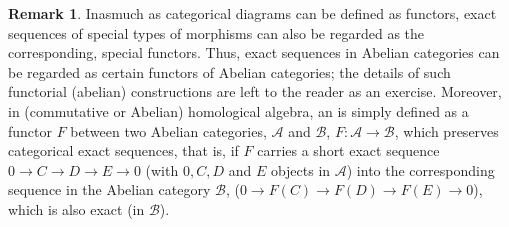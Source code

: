 \documentclass[12pt]{article}
\theoremstyle{plain}
\theoremstyle{definition}
\newtheorem{remark}{Remark}[section]
\numberwithin{equation}{section}
\begin{document}
\begin{remark}
Inasmuch as categorical diagrams can be defined as functors, exact sequences of special types of morphisms
can also be regarded as the corresponding, special functors. Thus, exact sequences in Abelian categories
can be regarded as certain functors of Abelian categories; the details of such functorial (abelian) constructions
are left to the reader as an exercise. Moreover, in (commutative or Abelian) homological algebra, an 
 is simply defined as a functor $F$ between two Abelian categories, $\mathcal{A}$ and $\mathcal{B}$, $F: \mathcal{A} \to \mathcal{B}$, which preserves categorical exact sequences, that is, if $F$ carries a short exact sequence  $0 \to C \to D \to E \to 0$ (with $0, C, D$ and $E$ objects in $\mathcal{A}$) into the corresponding sequence in the Abelian category $\mathcal{B}$,  ($0 \to F(C) \to F(D) \to F(E) \to 0$), which is also exact (in $\mathcal{B}$).
\end{remark}

\end{document}
